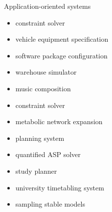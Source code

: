 \newcommand{\purpose}[1]{\hfill #1}
\begin{frame}[c]{Application-oriented systems}
  \begin{itemize}
  \item \aspartame\purpose{constraint solver}
  \item \aspcafe\purpose{vehicle equipment specification}
  \item \aspcud\purpose{software package configuration}
  \item \asprilo\purpose{warehouse simulator}
  \item \chasp\purpose{music composition}
  \item \flatzingo\purpose{constraint solver}
  \item \fluto\purpose{metabolic network expansion}
  \item \plasp\purpose{planning system}
  \item \qasp\purpose{quantified ASP solver}
  \item \spa\purpose{study planner}
  \item \teaspoon\purpose{university timetabling system}
  \item \xorro\purpose{sampling stable models}
  \end{itemize}
\end{frame}
%
